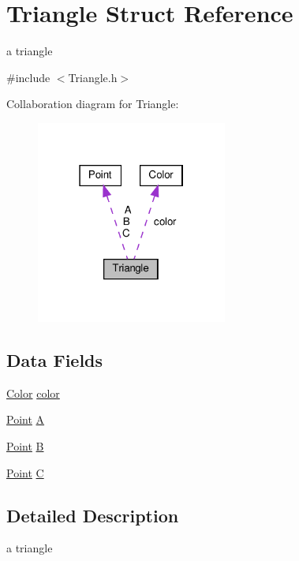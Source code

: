 \hypertarget{struct_triangle}{}\section{Triangle Struct Reference}
\label{struct_triangle}


a triangle  




{\ttfamily \#include $<$Triangle.\+h$>$}



Collaboration diagram for Triangle\+:\nopagebreak
\begin{figure}[H]
\begin{center}
\leavevmode
\includegraphics[width=178pt]{struct_triangle__coll__graph}
\end{center}
\end{figure}
\subsection*{Data Fields}
\begin{DoxyCompactItemize}
\item 
\hyperlink{struct_color}{Color} \hyperlink{struct_triangle_aa5f4d1eda21c196bd8401ff73f105073}{color}
\item 
\hyperlink{struct_point}{Point} \hyperlink{struct_triangle_a52df86c0a1979613c6b8ee0f785ba181}{A}
\item 
\hyperlink{struct_point}{Point} \hyperlink{struct_triangle_a42d857842a35fc7c3bfda0922ddcdd70}{B}
\item 
\hyperlink{struct_point}{Point} \hyperlink{struct_triangle_a3d8ff0c539667710e4db6c73b03dbc63}{C}
\end{DoxyCompactItemize}


\subsection{Detailed Description}
a triangle 

